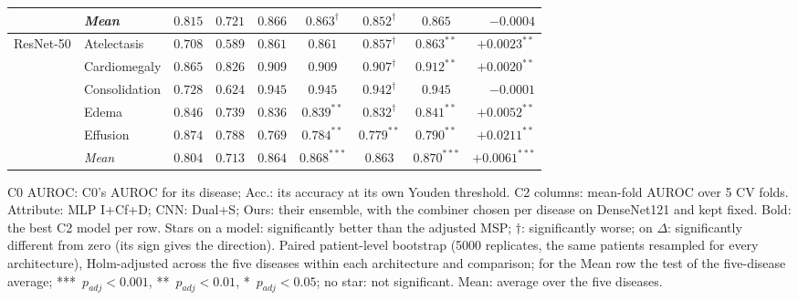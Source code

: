 \begin{table}[htbp]
\begin{threeparttable}
\begin{tabular}{ll|cc|c|ccc|r}
\cmidrule(l){2-9}
 & \textit{Mean} & $0.815$ & $0.721$ & $\mathbf{0.866}$ & $0.863^{\dagger}$ & $0.852^{\dagger}$ & $0.865$ & $-0.0004$ \\
\midrule
\multirow{6}{*}{ResNet-50} & Atelectasis & $0.708$ & $0.589$ & $0.861$ & $0.861$ & $0.857^{\dagger}$ & $\mathbf{0.863}^{**}$ & $+0.0023^{**}$ \\
 & Cardiomegaly & $0.865$ & $0.826$ & $0.909$ & $0.909$ & $0.907^{\dagger}$ & $\mathbf{0.912}^{**}$ & $+0.0020^{**}$ \\
 & Consolidation & $0.728$ & $0.624$ & $\mathbf{0.945}$ & $0.945$ & $0.942^{\dagger}$ & $0.945$ & $-0.0001$ \\
 & Edema & $0.846$ & $0.739$ & $0.836$ & $0.839^{**}$ & $0.832^{\dagger}$ & $\mathbf{0.841}^{**}$ & $+0.0052^{**}$ \\
 & Effusion & $0.874$ & $0.788$ & $0.769$ & $0.784^{**}$ & $0.779^{**}$ & $\mathbf{0.790}^{**}$ & $+0.0211^{**}$ \\
\cmidrule(l){2-9}
 & \textit{Mean} & $0.804$ & $0.713$ & $0.864$ & $0.868^{***}$ & $0.863$ & $\mathbf{0.870}^{***}$ & $+0.0061^{***}$ \\
\bottomrule
\end{tabular}
\begin{tablenotes}\footnotesize
\item C0 AUROC: C0's AUROC for its disease; Acc.: its accuracy at its own Youden threshold. C2 columns: mean-fold AUROC over 5 CV folds. Attribute: MLP I+Cf+D; CNN: Dual+S; Ours: their ensemble, with the combiner chosen per disease on DenseNet121 and kept fixed. Bold: the best C2 model per row. Stars on a model: significantly better than the adjusted MSP; $\dagger$: significantly worse; on $\Delta$: significantly different from zero (its sign gives the direction). Paired patient-level bootstrap (5000 replicates, the same patients resampled for every architecture), Holm-adjusted across the five diseases within each architecture and comparison; for the Mean row the test of the five-disease average; ***~$p_{adj} < 0.001$, **~$p_{adj} < 0.01$, *~$p_{adj} < 0.05$; no star: not significant. Mean: average over the five diseases.
\end{tablenotes}
\end{threeparttable}
\end{table}

